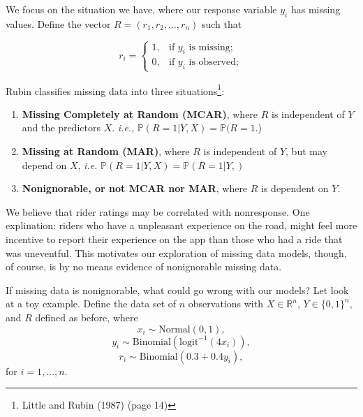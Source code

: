 \documentclass[12pt,twoside]{reedthesis}
\providecommand{\tightlist}{%
  \setlength{\itemsep}{0pt}\setlength{\parskip}{0pt}}
\begin{document}
  We focus on the situation we have, where our response variable \(y_i\)
  has missing values. Define the vector \(R = (r_1, r_2, \ldots, r_n)\)
  such that
  
  \begin{equation}
  r_i = \left\{ \begin{array}{ll}
  1, & \text{if } y_i \text{ is missing};\\
  0, & \text{if } y_i \text{ is observed};
  \end{array}
  \right.
  \end{equation}
  
  Rubin classifies missing data into three situations\footnote{Little and
    Rubin (1987) (page 14)}:
  
  \begin{enumerate}
  \def\labelenumi{\arabic{enumi}.}
  \tightlist
  \item
    \textbf{Missing Completely at Random (MCAR)}, where \(R\) is
    independent of \(Y\) and the predictors \(X\). \emph{i.e.},
    \(\mathbb{P} (R = 1| Y, X) = \mathbb{P}(R = 1\).)
  \item
    \textbf{Missing at Random (MAR)}, where \(R\) is independent of \(Y\),
    but may depend on \(X\), \emph{i.e.}
    \(\mathbb{P} (R = 1 |Y, X) = \mathbb{P} (R = 1 | Y, )\)
  \item
    \textbf{Nonignorable, or not MCAR nor MAR}, where \(R\) is dependent
    on \(Y\).
  \end{enumerate}
  
  We believe that rider ratings may be correlated with nonresponse. One
  explination: riders who have a unpleasant experience on the road, might
  feel more incentive to report their experience on the app than those who
  had a ride that was uneventful. This motivates our exploration of
  missing data models, though, of course, is by no means evidence of
  nonignorable missing data.
  
  If missing data is nonignorable, what could go wrong with our models?
  Let look at a toy example. Define the data set of \(n\) observations
  with \(X \in \mathbb{R}^n\), \(Y \in \{0,1\}^n\), and \(R\) defined as
  before, where \[x_i \sim \text{Normal}(0,1),\]
  \[y_i \sim \text{Binomial}(\text{logit}^{-1} (4x_i)),\]
  \[r_i \sim \text{Binomial}(0.3 + 0.4 y_i),\] for \(i = 1, \ldots, n\).
  
\end{document}

